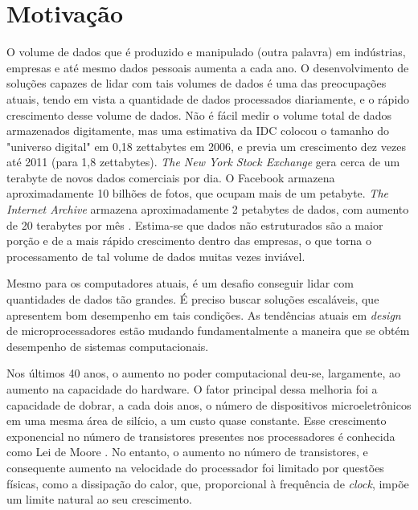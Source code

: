 


\section{Motivação}


O volume de dados que é produzido e manipulado (outra palavra) em indústrias, empresas e até mesmo dados pessoais aumenta a cada ano. O desenvolvimento de soluções capazes de lidar com tais volumes de dados é uma das preocupações atuais, tendo em vista a quantidade de dados processados diariamente, e o rápido crescimento desse volume de dados.
Não é fácil medir o volume total de dados armazenados digitamente, mas uma estimativa da IDC \cite{Gantz:2008} colocou o tamanho do "universo digital" em 0,18 zettabytes em 2006, e previa um crescimento dez vezes até 2011 (para 1,8 zettabytes).
 \textit{The New York Stock Exchange} gera cerca de um terabyte de novos dados comerciais por dia. O Facebook armazena aproximadamente 10 bilhões de fotos, que ocupam mais de um petabyte. \textit{The Internet Archive} armazena aproximadamente 2 petabytes de dados, com aumento de 20 terabytes por mês
\cite{Hadoop:2010}. Estima-se que dados não estruturados são a maior porção e de a mais rápido crescimento dentro das empresas, o que torna o processamento de tal volume de dados muitas vezes inviável.

Mesmo para os computadores atuais, é um desafio conseguir lidar com quantidades de dados tão grandes. É preciso buscar soluções escaláveis, que apresentem bom desempenho em tais condições. 
As tendências atuais em \textit{design} de microprocessadores estão mudando fundamentalmente a maneira que se obtém desempenho de sistemas computacionais. 

Nos últimos 40 anos, o aumento no poder computacional deu-se, largamente, ao aumento na capacidade do hardware. 
 O fator principal dessa melhoria foi a capacidade de dobrar, a cada dois anos, o número de dispositivos microeletrônicos em uma mesma área de silício, a um custo quase constante. Esse crescimento exponencial no número de transistores presentes nos processadores é conhecida como Lei de Moore \cite{Manferdelli:2008}. 
No entanto, o aumento no número de transistores, e consequente aumento na velocidade do processador  foi limitado por questões físicas, como a dissipação do calor, que, proporcional à frequência de \textit{clock}, impõe um limite natural ao seu crescimento.
  

